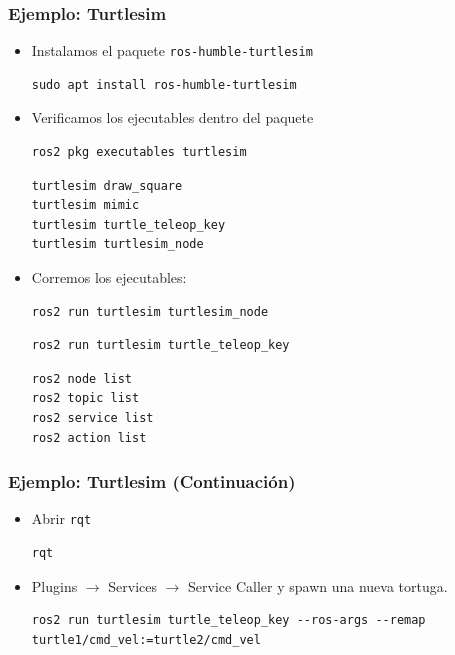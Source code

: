 \begin{frame}[fragile]
    \frametitle{Ejemplo: Turtlesim}
    \scriptsize
    \begin{itemize}

        \item Instalamos el paquete \lstinline[style=bash]{ros-humble-turtlesim}
        \begin{lstlisting}[style=bash]
sudo apt install ros-humble-turtlesim
        \end{lstlisting}
        \item Verificamos los ejecutables dentro del paquete
        \begin{lstlisting}[style=bash]
ros2 pkg executables turtlesim
        \end{lstlisting}
        \begin{lstlisting}[style=bash]
turtlesim draw_square
turtlesim mimic
turtlesim turtle_teleop_key
turtlesim turtlesim_node
        \end{lstlisting}
        \item Corremos los ejecutables:
        \begin{lstlisting}[style=bash]
ros2 run turtlesim turtlesim_node
        \end{lstlisting}

        \begin{lstlisting}[style=bash]
ros2 run turtlesim turtle_teleop_key
        \end{lstlisting}
        \begin{lstlisting}[style=bash]
ros2 node list
ros2 topic list
ros2 service list
ros2 action list
        \end{lstlisting}
    \end{itemize}    
\end{frame}

\begin{frame}[fragile]
	\frametitle{Ejemplo: Turtlesim (Continuación)}
    
    \begin{itemize}
        \item Abrir \lstinline[style=bash]{rqt}
        \begin{lstlisting}[style=bash]    
rqt
        \end{lstlisting}
        \item Plugins $\rightarrow$ Services $\rightarrow$ Service Caller y spawn una nueva tortuga.
        
        \footnotesize
        \begin{lstlisting}[style=bash]    
ros2 run turtlesim turtle_teleop_key --ros-args --remap turtle1/cmd_vel:=turtle2/cmd_vel
        \end{lstlisting}
    \end{itemize}


\end{frame}

